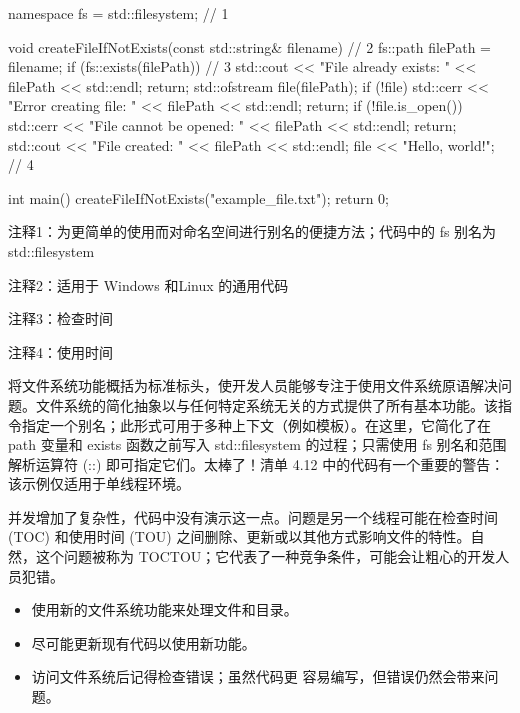 \begin{cpp}
namespace fs = std::filesystem; // 1

void createFileIfNotExists(const
    std::string& filename) { // 2
  fs::path filePath = filename;
  if (fs::exists(filePath)) { // 3
    std::cout << "File already exists: " << filePath << std::endl;
    return;
  }
  std::ofstream file(filePath);
  if (!file) {
    std::cerr << "Error creating file: " << filePath << std::endl;
    return;
  }
  if (!file.is_open()) {
    std::cerr << "File cannot be opened: " << filePath << std::endl;
    return;
  }
  std::cout << "File created: " << filePath << std::endl;
  file << "Hello, world!\n"; // 4
}

int main() {
  createFileIfNotExists("example_file.txt");
  return 0;
}
\end{cpp}

{\footnotesize
注释1：为更简单的使用而对命名空间进行别名的便捷方法；代码中的 fs 别名为 std::filesystem

注释2：适用于 Windows 和Linux 的通用代码

注释3：检查时间

注释4：使用时间
}

将文件系统功能概括为标准标头，使开发人员能够专注于使用文件系统原语解决问题。文件系统的简化抽象以与任何特定系统无关的方式提供了所有基本功能。该指令指定一个别名；此形式可用于多种上下文（例如模板）。在这里，它简化了在 path 变量和 exists 函数之前写入 std::filesystem 的过程；只需使用 fs 别名和范围解析运算符 (::) 即可指定它们。太棒了！清单 4.12 中的代码有一个重要的警告：该示例仅适用于单线程环境。

并发增加了复杂性，代码中没有演示这一点。问题是另一个线程可能在检查时间 (TOC) 和使用时间 (TOU) 之间删除、更新或以其他方式影响文件的特性。自然，这个问题被称为 TOCTOU；它代表了一种竞争条件，可能会让粗心的开发人员犯错。


\begin{itemize}
\item
使用新的文件系统功能来处理文件和目录。

\item
尽可能更新现有代码以使用新功能。

\item
访问文件系统后记得检查错误；虽然代码更 容易编写，但错误仍然会带来问题。
\end{itemize}














